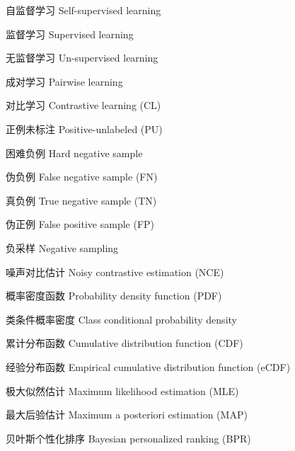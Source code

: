 \begin{denotation}
\item[自监督学习] Self-supervised learning
\item[监督学习] Supervised learning
\item[无监督学习]  Un-supervised learning
\item[成对学习]  Pairwise learning
\item[对比学习] Contrastive learning (CL)
\item[正例未标注] Positive-unlabeled (PU)
\item[困难负例] Hard negative sample
\item[伪负例] False negative sample (FN)
\item[真负例] True negative sample (TN)
\item[伪正例] False positive sample (FP)
\item[负采样] Negative sampling 
\item[噪声对比估计] Noisy contrastive estimation (NCE)
\item[概率密度函数] Probability density function (PDF)
\item[类条件概率密度] Class conditional probability density 
\item[累计分布函数] Cumulative distribution function (CDF)
\item[经验分布函数] Empirical cumulative distribution function (eCDF)
\item[极大似然估计] Maximum likelihood estimation (MLE)
\item[最大后验估计] Maximum a posteriori estimation (MAP)
\item[贝叶斯个性化排序] Bayesian personalized ranking (BPR)
\end{denotation}
